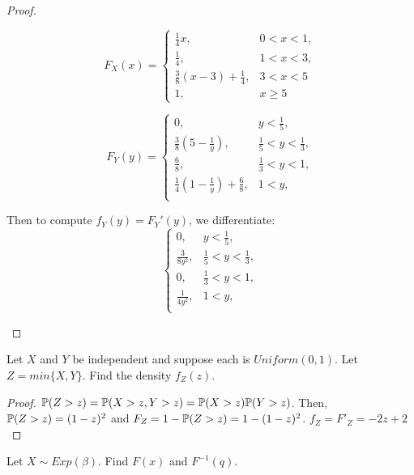 \documentclass[10pt]{article}
\begin{document}
\begin{proof}
    \begin{itemize}
    \begin{item}\[
    F_X(x) =
    \begin{cases}
    \frac{1}{4}x, & 0 < x < 1, \\
    \frac{1}{4}, & 1 < x < 3, \\
    \frac{3}{8}(x -3) + \frac{1}{4}, & 3 < x < 5 \\
    1, & x \geq 5
    \end{cases}
    \]
    \end{item}
    \begin{item}\[
    F_Y(y) =
    \begin{cases}
        0, & y < \frac{1}{5}, \\
        \frac{3}{8}(5-\frac{1}{y}), & \frac{1}{5} < y < \frac{1}{3}, \\
        \frac{6}{8}, & \frac{1}{3} < y < 1, \\
        \frac{1}{4}(1 - \frac{1}{y}) + \frac{6}{8}, & 1 < y, \\
    \end{cases}
    \]

    Then to compute $f_Y(y) = F_Y'(y)$, we differentiate:
    \[
    \begin{cases}
        0, & y < \frac{1}{5}, \\
        \frac{3}{8y^2}, & \frac{1}{5} < y < \frac{1}{3}, \\
        0, & \frac{1}{3} < y < 1, \\
        \frac{1}{4y^2}, & 1 < y, \\
    \end{cases}
    \]
    \end{item}
\end{itemize}
\end{proof}

\setcounter{exercise}{6}
\begin{exercise}
    Let $X$ and $Y$ be independent and suppose each is $Uniform(0, 1)$. Let 
    $Z = min\{X, Y\}$. Find the density $f_Z(z)$.
\end{exercise}

\begin{proof}
    $\P(Z > z) = \P(X > z, Y > z) = \P(X > z)\P(Y > z)$.
    Then, $\P(Z > z) = (1 - z)^2$ and $F_Z = 1 - \P(Z > z) = 1 - (1 - z)^2$.
    $f_Z = F'_Z = -2z + 2$
\end{proof}

\setcounter{exercise}{8}
\begin{exercise}
    Let $X \sim Exp(\beta)$. Find $F(x)$ and $F^{-1}(q)$.
\end{exercise}
\end{document}
